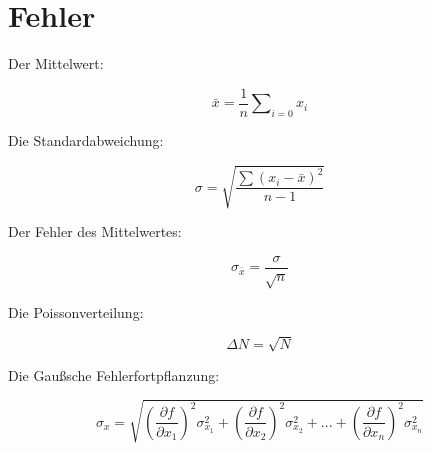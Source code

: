 \section{Fehler}
\label{sec:Fehler}
Der Mittelwert:
\begin{center}
  \begin{equation}
    \label{eq:Mittelwert}
  \bar{x} = \frac{1}{n} \sum \nolimits_{i=0} x_i
  \end{equation} 
\end{center}

Die Standardabweichung:
\begin{center}
  \begin{equation}
    \label{eq:standardabweichung}
    \sigma=\sqrt{\frac{\sum(x_i-\bar{x})^2}{n-1}}
  \end{equation}
\end{center}

Der Fehler des Mittelwertes:
\begin{center}
  \begin{equation}
    \label{eq:mittelwertfehler}
    \sigma_{\bar{x}}=\frac{\sigma}{\sqrt{n}}
  \end{equation}

  
\end{center}

Die Poissonverteilung:
\begin{center}
    \begin{equation}
        \label{eq:poisson}
        \Delta N=\sqrt{N}
        \end{equation}
\end{center}

Die Gaußsche Fehlerfortpflanzung:
\begin{center}
\begin{equation}
  \label{eq:gaussfehler}  
\sigma_x=\sqrt{(\frac{\partial f}{\partial x_1})^2\sigma_{x_1}^2+(\frac{\partial f}{\partial x_2})^2\sigma_{x_2}^2+...+(\frac{\partial f}{\partial x_n})^2\sigma_{x_n}^2}
\end{equation}
\end{center}